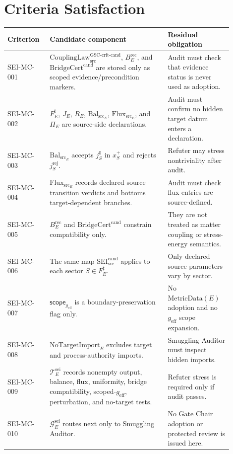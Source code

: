\documentclass[11pt]{article}
\newcommand{\MetricData}{\mathrm{MetricData}}
\newcommand{\geff}{g_{\mathrm{eff}}}
\newcommand{\CouplingLawCrit}{\mathrm{CouplingLaw}_{\mathrm{src}}^{\mathrm{GSC\mbox{-}crit\mbox{-}cand}}}
\newcommand{\BridgeCertCand}{\mathrm{BridgeCert}^{\mathrm{cand}}}
\newcommand{\BErec}{B_E^{\mathrm{rec}}}
\newcommand{\SEICand}{\mathrm{SEI}_{\mathrm{src}}^{\mathrm{cand}}}
\newcommand{\BalSrc}{\mathrm{Bal}_{\mathrm{src}}}
\newcommand{\FluxSrc}{\mathrm{Flux}_{\mathrm{src}}}
\newcommand{\NoTargetImport}{\mathrm{NoTargetImport}}
\begin{document}
\section{Criteria Satisfaction}

\begin{longtable}{p{0.16\linewidth}p{0.48\linewidth}p{0.26\linewidth}}
\toprule
Criterion & Candidate component & Residual obligation \\
\midrule
SEI-MC-001 &
\(\CouplingLawCrit\), \(\BErec\), and \(\BridgeCertCand\) are stored only as
scoped evidence/precondition markers. &
Audit must check that evidence status is never used as adoption. \\
\addlinespace
SEI-MC-002 &
\(F_E^\sharp\), \(J_E\), \(R_E\), \(\BalSrc_E\), \(\FluxSrc_E\), and
\(\Pi_E\) are source-side declarations. &
Audit must confirm no hidden target datum enters a declaration. \\
\addlinespace
SEI-MC-003 &
\(\BalSrc_E\) accepts \(j_S^0\) in \(x_S^+\) and rejects
\(j_S^{\mathrm{rej}}\). &
Refuter may stress nontriviality after audit. \\
\addlinespace
SEI-MC-004 &
\(\FluxSrc_E\) records declared source transition verdicts and bottoms
target-dependent branches. &
Audit must check flux entries are source-defined. \\
\addlinespace
SEI-MC-005 &
\(\BErec\) and \(\BridgeCertCand\) constrain compatibility only. &
They are not treated as matter coupling or stress-energy semantics. \\
\addlinespace
SEI-MC-006 &
The same map \(\SEICand\) applies to each sector \(S\in F_E^\sharp\). &
Only declared source parameters vary by sector. \\
\addlinespace
SEI-MC-007 &
\(\mathsf{scope}_{\geff}\) is a boundary-preservation flag only. &
No \(\MetricData(E)\) adoption and no \(\geff\) scope expansion. \\
\addlinespace
SEI-MC-008 &
\(\NoTargetImport_E\) excludes target and process-authority imports. &
Smuggling Auditor must inspect hidden imports. \\
\addlinespace
SEI-MC-009 &
\(\mathcal{T}_E^{\mathrm{sei}}\) records nonempty output, balance, flux,
uniformity, bridge compatibility, scoped-\(\geff\), perturbation, and
no-target tests. &
Refuter stress is required only if audit passes. \\
\addlinespace
SEI-MC-010 &
\(\mathcal{G}_E^{\mathrm{sei}}\) routes next only to Smuggling Auditor. &
No Gate Chair adoption or protected review is issued here. \\
\bottomrule
\end{longtable}
\end{document}
